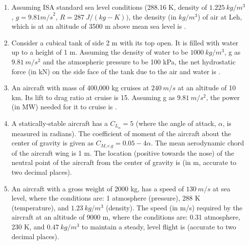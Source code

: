 \documentclass[journal,12pt,onecolumn]{IEEEtran}
\theoremstyle{remark}
\begin{document}
\begin{enumerate}
    \item Assuming ISA standard sea level conditions (288.16 K, density of $1.225~kg/m^{3}$, $g=9.81{m/s}^{2}$, $R=287~J/(kg-K))$, the density (in $kg/m^{3}$) of air at Leh, which is at an altitude of 3500 m above mean sea level is \underline{\hspace{2cm}} .
    \hfill{}

    \item Consider a cubical tank of side 2 m with its top open. It is filled with water up to a height of 1 m. Assuming the density of water to be $1000~kg/m^{3}$, g as $9.81~m/s^{2}$ and the atmospheric pressure to be 100 kPa, the net hydrostatic force (in kN) on the side face of the tank due to the air and water is \underline{\hspace{2cm}} .
    \hfill{}

    \item An aircraft with mass of 400,000 kg cruises at $240~m/s$ at an altitude of 10 km. Its lift to drag ratio at cruise is 15. Assuming g as $9.81~m/s^{2}$, the power (in MW) needed for it to cruise is \underline{\hspace{2cm}} .
    \hfill{}

    \item A statically-stable aircraft has a ${C_{L_{\alpha}}}=5$ (where the angle of attack, $\alpha$, is measured in radians). The coefficient of moment of the aircraft about the center of gravity is given as $C_{M,c.g}=0.05-4\alpha$. The mean aerodynamic chord of the aircraft wing is 1 m. The location (positive towards the nose) of the neutral point of the aircraft from the center of gravity is \underline{\hspace{2cm}} (in m, accurate to two decimal places).
    \hfill{}

    \item An aircraft with a gross weight of 2000 kg, has a speed of $130~m/s$ at sea level, where the conditions are: 1 atmosphere (pressure), 288 K (temperature), and $1.23~kg/m^{3}$ (density). The speed (in m/s) required by the aircraft at an altitude of 9000 m, where the conditions are: 0.31 atmosphere, 230 K, and $0.47~kg/m^{3}$ to maintain a steady, level flight is \underline{\hspace{2cm}} (accurate to two decimal places).
    \hfill{}


\end{enumerate}
\end{document}
